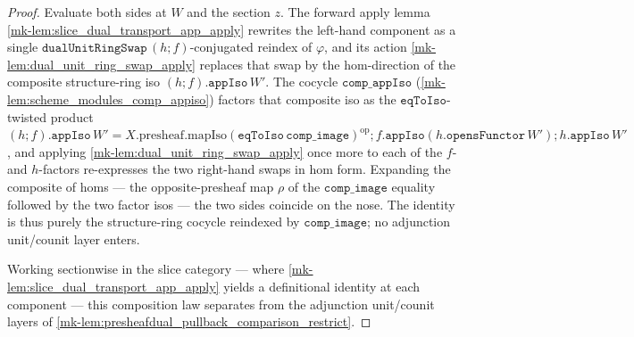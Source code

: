 \begin{proof}
  \leanok
  Evaluate both sides at \(W\) and the section \(z\). The forward apply lemma
  \ref{mk-lem:slice_dual_transport_app_apply} rewrites the left-hand component as a single
  \(\mathtt{dualUnitRingSwap}\,(h\mathbin{;}f)\)-conjugated reindex of \(\varphi\), and its action
  \ref{mk-lem:dual_unit_ring_swap_apply} replaces that swap by the \(\mathrm{hom}\)-direction of the
  composite structure-ring iso \((h\mathbin{;}f).\mathtt{appIso}\,W'\). The cocycle \(\mathtt{comp\_appIso}\)
  (\ref{mk-lem:scheme_modules_comp_appiso}) factors that composite iso as the \(\mathtt{eqToIso}\)-twisted
  product
  \((h\mathbin{;}f).\mathtt{appIso}\,W' = X.\mathrm{presheaf}.\mathrm{mapIso}(\mathtt{eqToIso}\,
  \mathtt{comp\_image})^{\mathrm{op}} \mathbin{;} f.\mathtt{appIso}(h.\mathtt{opensFunctor}\,W')
  \mathbin{;} h.\mathtt{appIso}\,W'\), and applying \ref{mk-lem:dual_unit_ring_swap_apply} once more to each
  of the \(f\)- and \(h\)-factors re-expresses the two right-hand swaps in \(\mathrm{hom}\) form. Expanding
  the composite of homs --- the opposite-presheaf map \(\rho\) of the \(\mathtt{comp\_image}\) equality
  followed by the two factor isos --- the two sides coincide on the nose. The identity is thus purely the
  structure-ring cocycle reindexed by \(\mathtt{comp\_image}\); no adjunction unit/counit layer enters.

  Working sectionwise in the slice category --- where \ref{mk-lem:slice_dual_transport_app_apply} yields a
  definitional identity at each component --- this composition law separates from the adjunction
  unit/counit layers of \ref{mk-lem:presheafdual_pullback_comparison_restrict}.
\end{proof}

